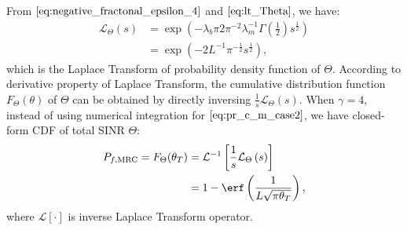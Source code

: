 From $\eqref{eq:negative_fractonal_epsilon_4}$ and $\eqref{eq:lt_Theta}$, we have:
\begin{align}
\mathcal{L}_{\Theta}\left( s \right) &= \exp(-\lambda_{b} \pi 2\pi^{-2}\lambda_{m}^{-1} \Gamma(\frac{1}{2}) s^{\frac{1}{2}}) \nonumber \\
&= \exp(-2L^{-1}\pi^{-\frac{1}{2}}  s^{\frac{1}{2}}), 
\end{align}
which is the Laplace Transform of probability density function of $\Theta$. According to derivative property of Laplace Transform, the cumulative distribution function $F_{\Theta} (\theta) $ of ${\Theta}$ can be obtained by directly inversing $\frac{1}{s} \mathcal{L}_{\Theta}\left( s \right)$.
When $\gamma = 4$, instead of using numerical integration for $\eqref{eq:pr_c_m_case2}$, we have closed-form CDF of total SINR $\Theta$:
\begin{align}
P_{f, \text{MRC}}  = F_{\Theta} (\theta_{T}) 
&= \mathcal{L}^{-1} \left[ \frac{1}{s} \mathcal{L}_{\Theta}\left( s \right) \right]  \nonumber\\
&=1 -\erf \left( 
\frac{1}{ L \sqrt{\pi \theta_{T}}}
\right),
\end{align}
where $\mathcal{L} \left[ \cdot \right] $ is inverse Laplace Transform operator.

%



